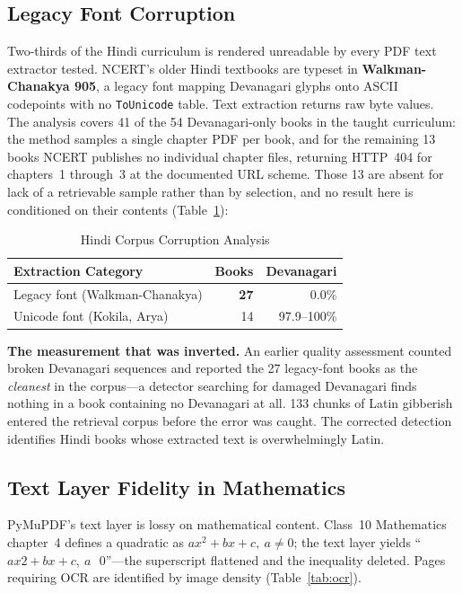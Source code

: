 \documentclass[conference]{IEEEtran}
\begin{document}
\subsection{Legacy Font Corruption}
\label{sec:legacy}
Two-thirds of the Hindi curriculum is rendered unreadable by every PDF text extractor tested. NCERT's older Hindi textbooks are typeset in \textbf{Walkman-Chanakya 905}, a legacy font mapping Devanagari glyphs onto ASCII codepoints with no \texttt{ToUnicode} table. Text extraction returns raw byte values. The analysis covers 41 of the 54 Devanagari-only books in the taught curriculum: the method samples a single chapter PDF per book, and for the remaining 13 books NCERT publishes no individual chapter files, returning HTTP~404 for chapters~1 through~3 at the documented URL scheme. Those 13 are absent for lack of a retrievable sample rather than by selection, and no result here is conditioned on their contents (Table~\ref{tab:legacy}):

\begin{table}[htbp]
\caption{Hindi Corpus Corruption Analysis}
\label{tab:legacy}
\centering
\begin{tabular}{@{}lrr@{}}
\toprule
\textbf{Extraction Category} & \textbf{Books} & \textbf{Devanagari} \\
\midrule
Legacy font (Walkman-Chanakya) & \textbf{27} & 0.0\% \\
Unicode font (Kokila, Arya) & 14 & 97.9--100\% \\
\bottomrule
\end{tabular}
\end{table}

\textbf{The measurement that was inverted.} An earlier quality assessment counted broken Devanagari sequences and reported the 27 legacy-font books as the \textit{cleanest} in the corpus---a detector searching for damaged Devanagari finds nothing in a book containing no Devanagari at all. 133 chunks of Latin gibberish entered the retrieval corpus before the error was caught. The corrected detection identifies Hindi books whose extracted text is overwhelmingly Latin.

\subsection{Text Layer Fidelity in Mathematics}
PyMuPDF's text layer is lossy on mathematical content. Class~10 Mathematics chapter~4 defines a quadratic as $ax^2 + bx + c,\ a \neq 0$; the text layer yields ``$ax2 + bx + c,\ a\text{~~}0$''---the superscript flattened and the inequality deleted. Pages requiring OCR are identified by image density (Table~\ref{tab:ocr}).
\end{document}
